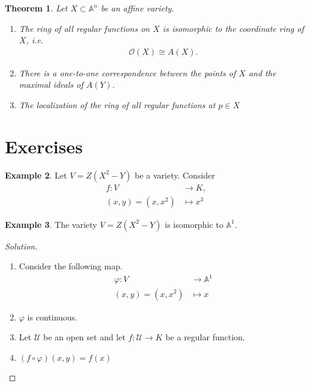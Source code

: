 \documentclass[11pt]{book}
\newtheorem{theorem}{Theorem}[section]
\newenvironment{solution}
  {\renewcommand{\qedsymbol}{}\begin{proof}[Solution]}
  {\end{proof}}
\theoremstyle{definition}
\newtheorem{example}[theorem]{Example}
\numberwithin{equation}{section}
\begin{document}
\begin{thmbox}
    \begin{theorem}
        Let \(X \subset \mathbb{A}^n\) be an affine variety.
        \begin{enumerate}
            \item The ring of all regular functions on \(X\) is isomorphic to the coordinate ring of \(X\), i.e.
            \begin{align*}
                \mathcal{O}(X) \cong A(X) \text{.}
            \end{align*}
            \item There is a one-to-one correspondence between the points of \(X\) and the maximal ideals of \(A(Y)\).
            \item The localization of the ring of all regular functions at \(p \in X\)
        \end{enumerate}
    \end{theorem}
\end{thmbox}

\newpage
\section{Exercises}
\begin{example}
    Let \(V = Z(X^2 - Y)\) be a variety. Consider
    \begin{align*}
        f: V & \rightarrow K, \\
        (x, y) = (x, x^2) & \mapsto x^3
    \end{align*}
\end{example}

\begin{example}
    The variety \(V = Z(X^2 - Y)\) is isomorphic to \(\mathbb{A}^1\).
\end{example}
\begin{solution}
    \begin{enumerate}
        \item Consider the following map.
        \begin{align*}
            \varphi: V &\rightarrow \mathbb{A}^1 \\
            (x, y) = (x, x^2) &\mapsto x
        \end{align*}
        \item \(\varphi\) is continuous.
        \item Let \(\mathcal{U}\) be an open set and let \(f: \mathcal{U} \rightarrow K\) be a regular function.
        \item \((f \circ \varphi) (x, y) = f(x)\)
    \end{enumerate}
\end{solution}
\end{document}
